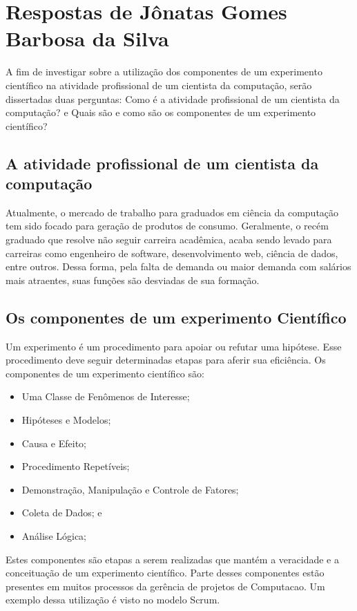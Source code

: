\section{Respostas de Jônatas Gomes Barbosa da Silva}
A fim de investigar sobre a utilização dos componentes de um experimento científico na atividade profissional de um cientista da computação, serão dissertadas duas perguntas: Como é a atividade profissional de um cientista da computação? e Quais são e como são os componentes de um experimento científico?

\subsection{A atividade profissional de um cientista da computação}
Atualmente, o mercado de trabalho para graduados em ciência da computação tem sido focado para geração de produtos de consumo. Geralmente, o recém graduado que resolve não seguir carreira acadêmica, acaba sendo levado para carreiras como engenheiro de software, desenvolvimento web, ciência de dados, entre outros. Dessa forma, pela falta de demanda ou maior demanda com salários mais atraentes, suas funções são desviadas de sua formação. 

\subsection{Os componentes de um experimento Científico}
Um \gls{experimento} é um procedimento para apoiar ou refutar uma hipótese. Esse procedimento deve seguir determinadas etapas para aferir sua eficiência. Os componentes de um experimento científico são:
\begin{itemize}
    \item Uma Classe de Fenômenos de Interesse;
    \item Hipóteses e Modelos;
    \item Causa e Efeito;
    \item Procedimento Repetíveis;
    \item Demonstração, Manipulação e Controle de Fatores;
    \item Coleta de Dados; e
    \item Análise Lógica;
\end{itemize}

Estes componentes são etapas a serem realizadas que mantém a veracidade e a conceituação de um experimento científico. Parte desses componentes estão presentes em muitos processos da gerência de projetos de \gls{Computacao}. Um exemplo dessa utilização é visto no modelo Scrum.

